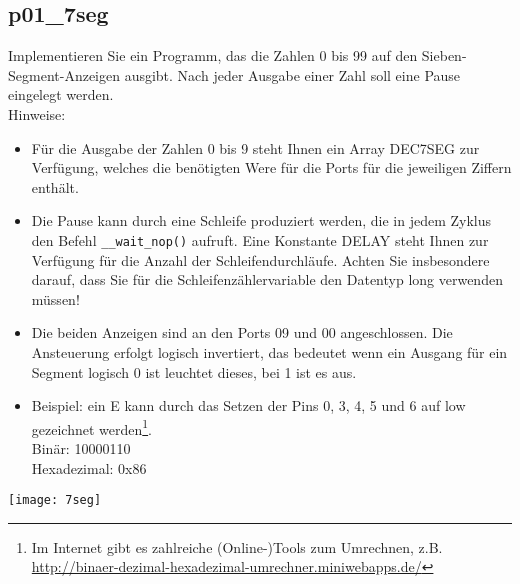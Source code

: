 \documentclass[
  accentcolor=tud1c,	%
  colorbacktitle,		%
  inverttitle,			%
  german,				%
  twoside
]{tudexercise}
\begin{document}
\subsection{p01\_7seg}
\label{exercise7Segment}

Implementieren Sie ein Programm, das die Zahlen 0 bis 99 auf den Sieben-Segment-Anzeigen ausgibt. Nach jeder Ausgabe einer Zahl soll eine Pause eingelegt werden.\\
Hinweise:\begin{itemize}
\item 
Für die Ausgabe der Zahlen 0 bis 9 steht Ihnen ein Array DEC7SEG zur Verfügung, welches die benötigten Were für die Ports für die jeweiligen Ziffern enthält.

\item 
Die Pause kann durch eine Schleife produziert werden, die in jedem Zyklus den Befehl \texttt{\_\_wait\_nop()} aufruft. Eine Konstante DELAY steht Ihnen zur Verfügung für die Anzahl der Schleifendurchläufe. Achten Sie insbesondere darauf, dass Sie für die Schleifenzählervariable den Datentyp long verwenden müssen!

\item
Die beiden Anzeigen sind an den Ports 09 und 00 angeschlossen. Die Ansteuerung erfolgt logisch invertiert, das bedeutet wenn ein Ausgang für ein Segment logisch 0 ist leuchtet dieses, bei 1 ist es aus.

\item
Beispiel: ein \glqq{}E\grqq{} kann durch das Setzen der Pins 0, 3, 4, 5 und 6 auf low gezeichnet werden\footnote{
	Im Internet gibt es zahlreiche (Online-)Tools zum Umrechnen, z.B. 
	\url{http://binaer-dezimal-hexadezimal-umrechner.miniwebapps.de/}
}.\\
Binär: 10000110\\
Hexadezimal: 0x86
\end{itemize}
\begin{center}\texttt{[image: 7seg]}\end{center}
\end{document}
